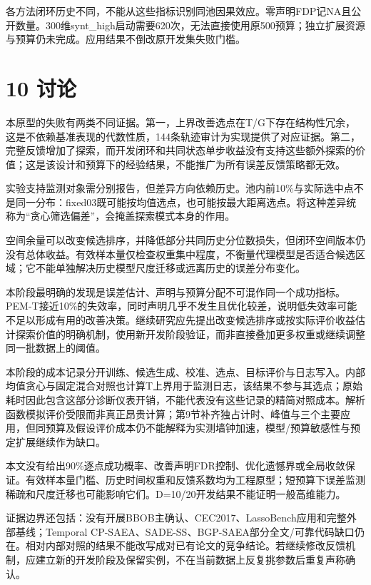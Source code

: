 \documentclass[11pt,a4paper]{article}
\begin{document}
各方法闭环历史不同，不能从这些指标识别同池因果效应。零声明FDP记NA且公开数量。300维synt\_high启动需要620次，无法直接使用原500预算；独立扩展资源与预算仍未完成。应用结果不倒改原开发集失败门槛。

\hypertarget{ux8ba8ux8bba}{%
\section{10 讨论}\label{ux8ba8ux8bba}}

本原型的失败有两类不同证据。第一，上界改善选点在T/G下存在结构性冗余，这是不依赖基准表现的代数性质，144条轨迹审计为实现提供了对应证据。第二，完整反馈增加了探索，而开发闭环和共同状态单步收益没有支持这些额外探索的价值；这是该设计和预算下的经验结果，不能推广为所有误差反馈策略都无效。

实验支持监测对象需分别报告，但差异方向依赖历史。池内前10\%与实际选中点不是同一分布：fixed03既可能按均值选点，也可能按最大距离选点。将这种差异统称为``贪心筛选偏差''，会掩盖探索模式本身的作用。

空间余量可以改变候选排序，并降低部分共同历史分位数损失，但闭环空间版本仍没有总体收益。有效样本量仅检查权重集中程度，不衡量代理模型是否适合候选区域；它不能单独解决历史模型尺度迁移或远离历史的误差分布变化。

本阶段最明确的发现是误差估计、声明与预算分配不可混作同一个成功指标。PEM-T接近10\%的失效率，同时声明几乎不发生且优化较差，说明低失效率可能不足以形成有用的改善决策。继续研究应先提出改变候选排序或按实际评价收益估计探索价值的明确机制，使用新开发阶段验证，而非直接叠加更多权重或继续调整同一批数据上的阈值。

本阶段的成本记录分开训练、候选生成、校准、选点、目标评价与日志写入。内部均值贪心与固定混合对照也计算T上界用于监测日志，该结果不参与其选点；原始耗时因此包含这部分诊断仪表开销，不能代表没有这些记录的精简对照成本。解析函数模拟评价受限而非真正昂贵计算；第9节补齐独占计时、峰值与三个主要应用，但同预算及假设评价成本仍不能解释为实测墙钟加速，模型/预算敏感性与预定扩展继续作为缺口。

本文没有给出90\%逐点成功概率、改善声明FDR控制、优化遗憾界或全局收敛保证。有效样本量门槛、历史时间权重和反馈系数均为工程原型；短预算下误差监测稀疏和尺度迁移也可能影响它们。D=10/20开发结果不能证明一般高维能力。

证据边界还包括：没有开展BBOB主确认、CEC2017、LassoBench应用和完整外部基线；Temporal
CP-SAEA、SADE-SS、BGP-SAEA部分全文/可靠代码缺口仍在。相对内部对照的结果不能改写成对已有论文的竞争结论。若继续修改反馈机制，应建立新的开发阶段及保留实例，不在当前数据上反复挑参数后重复声称确认。
\end{document}

